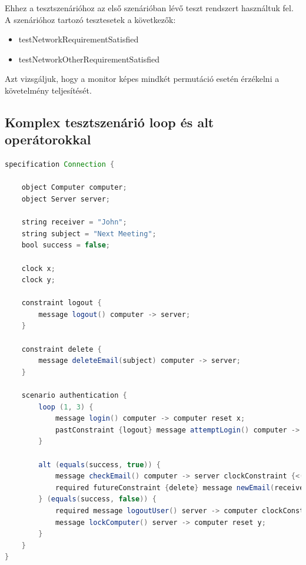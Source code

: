 Ehhez a tesztszenárióhoz az első szenárióban lévő teszt rendszert használtuk fel.
A szenárióhoz tartozó tesztesetek a következők:

\begin{itemize}
    \item testNetworkRequirementSatisfied
    \item testNetworkOtherRequirementSatisfied
\end{itemize}

Azt vizsgáljuk, hogy a monitor képes mindkét permutáció esetén érzékelni a követelmény teljesítését.

\clearpage\subsection{Komplex tesztszenárió loop és alt operátorokkal}

\begin{lstlisting}[language=java, frame=single, float=ht!, caption={Integrációs teszteset.},captionpos=b]
specification Connection {

    object Computer computer;
    object Server server;

    string receiver = "John";
    string subject = "Next Meeting";
    bool success = false;

    clock x;
    clock y;

    constraint logout {
        message logout() computer -> server;
    }

    constraint delete {
        message deleteEmail(subject) computer -> server;
    }

    scenario authentication {
        loop (1, 3) {
            message login() computer -> computer reset x;
            pastConstraint {logout} message attemptLogin() computer -> server reset y;
        }

        alt (equals(success, true)) {
            message checkEmail() computer -> server clockConstraint {<(x, 2)};
            required futureConstraint {delete} message newEmail(receiver, subject) computer -> server reset x;
        } (equals(success, false)) {
            required message logoutUser() server -> computer clockConstraint {>(y, 3)};
            message lockComputer() server -> computer reset y;
        }
    }
}
\end{lstlisting}

